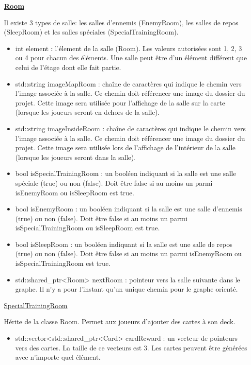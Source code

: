\underline{\textbf{Room}}
\par Il existe 3 types de salle: les salles d'ennemis (EnemyRoom), les salles de repos (SleepRoom) et les salles spéciales (SpecialTrainingRoom).
\begin{itemize}
    \item int element : l'élement de la salle (Room). Les valeurs autorisées sont 1, 2, 3 ou 4 pour chacun des éléments. Une salle peut être d'un élément différent que celui de l'étage dont elle fait partie.
    \item std::string imageMapRoom : chaîne de caractères qui indique le chemin vers l'image associée à la salle. Ce chemin doit référencer une image du dossier du projet. Cette image sera utilisée pour l'affichage de la salle sur la carte (lorsque les joueurs seront en dehors de la salle).
    \item std::string imageInsideRoom : chaîne de caractères qui indique le chemin vers l'image associée à la salle. Ce chemin doit référencer une image du dossier du projet. Cette image sera utilisée lors de l'affichage de l'intérieur de la salle (lorsque les joueurs seront dans la salle).
    \item bool isSpecialTrainingRoom : un booléen indiquant si la salle est une salle spéciale (true) ou non (false). Doit être false si au moins un parmi isEnemyRoom ou isSleepRoom est true.
    \item bool isEnemyRoom : un booléen indiquant si la salle est une salle d'ennemis (true) ou non (false). Doit être false si au moins un parmi isSpecialTrainingRoom ou isSleepRoom est true.
    \item bool isSleepRoom : un booléen indiquant si la salle est une salle de repos (true) ou non (false). Doit être false si au moins un parmi isEnemyRoom ou isSpecialTrainingRoom est true.
    \item std::shared\_ptr<Room> nextRoom : pointeur vers la salle suivante dans le graphe. Il n'y a pour l'instant qu'un unique chemin pour le graphe orienté.
\end{itemize}

\underline{SpecialTrainingRoom}
\par Hérite de la classe Room. Permet aux joueurs d'ajouter des cartes à son deck.
\begin{itemize}
    \item std::vector<std::shared\_ptr<Card> cardReward : un vecteur de pointeurs vers des cartes. La taille de ce vecteurs est 3. Les cartes peuvent être générées avec n'importe quel élément.
\end{itemize}

